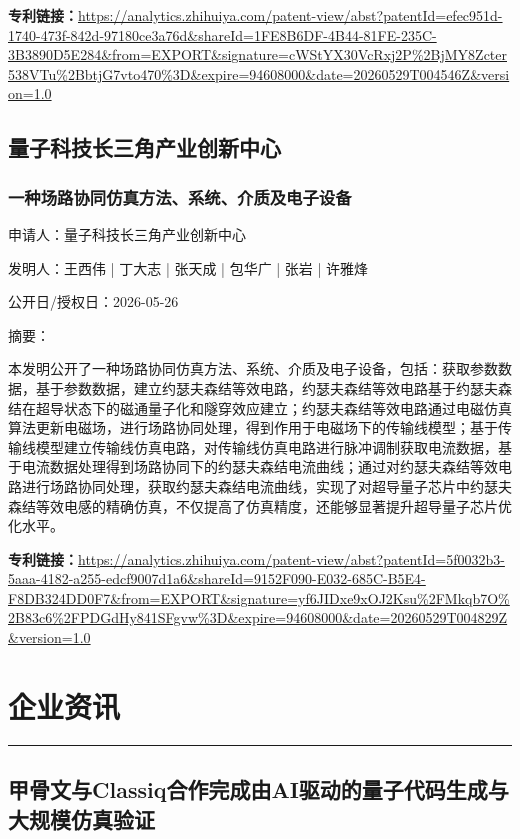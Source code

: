 \documentclass[12pt,a4paper]{ctexart}
\begin{document}
\noindent\textbf{专利链接：}\url{https://analytics.zhihuiya.com/patent-view/abst?patentId=efec951d-1740-473f-842d-97180ce3a76d&shareId=1FE8B6DF-4B44-81FE-235C-3B3890D5E284&from=EXPORT&signature=cWStYX30VcRxj2P%2BjMY8Zcter538VTu%2BbtjG7vto470%3D&expire=94608000&date=20260529T004546Z&version=1.0 }


\subsection{ 量子科技长三角产业创新中心 }

\subsubsection{ 一种场路协同仿真方法、系统、介质及电子设备 }

申请人：量子科技长三角产业创新中心

发明人：王西伟 | 丁大志 | 张天成 | 包华广 | 张岩 | 许雅烽

公开日/授权日：2026-05-26

摘要：

本发明公开了一种场路协同仿真方法、系统、介质及电子设备，包括：获取参数数据，基于参数数据，建立约瑟夫森结等效电路，约瑟夫森结等效电路基于约瑟夫森结在超导状态下的磁通量子化和隧穿效应建立；约瑟夫森结等效电路通过电磁仿真算法更新电磁场，进行场路协同处理，得到作用于电磁场下的传输线模型；基于传输线模型建立传输线仿真电路，对传输线仿真电路进行脉冲调制获取电流数据，基于电流数据处理得到场路协同下的约瑟夫森结电流曲线；通过对约瑟夫森结等效电路进行场路协同处理，获取约瑟夫森结电流曲线，实现了对超导量子芯片中约瑟夫森结等效电感的精确仿真，不仅提高了仿真精度，还能够显著提升超导量子芯片优化水平。

\noindent\textbf{专利链接：}\url{https://analytics.zhihuiya.com/patent-view/abst?patentId=5f0032b3-5aaa-4182-a255-edcf9007d1a6&shareId=9152F090-E032-685C-B5E4-F8DB324DD0F7&from=EXPORT&signature=yf6JIDxe9xOJ2Ksu%2FMkqb7O%2B83c6%2FPDGdHy841SFgvw%3D&expire=94608000&date=20260529T004829Z&version=1.0 }




\newpage
\section{企业资讯}
\vspace{-0.5em}
\noindent\rule{\linewidth}{1.5pt}

\subsection{ 甲骨文与Classiq合作完成由AI驱动的量子代码生成与大规模仿真验证 }
\end{document}
